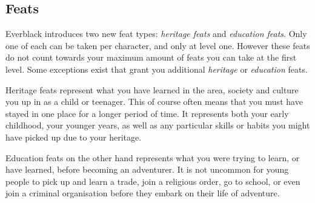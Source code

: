 \subsection{Feats}

Everblack introduces two new feat types: \emph{heritage feats} and
\emph{education feats}. Only one of each can be taken per character, and only
at level one. However these feats do not count towards your maximum amount of
feats you can take at the first level. Some exceptions exist that grant you
additional \emph{heritage} or \emph{education} feats.

Heritage feats represent what you have learned in the area, society and
culture you up in as a child or teenager. This of course often means that you
must have stayed in one place for a longer period of time. It represents both
your early childhood, your younger years, as well as any particular skills or
habits you might have picked up due to your heritage.

Education feats on the other hand represents what you were trying to learn,
or have learned, before becoming an adventurer. It is not uncommon for young
people to pick up and learn a trade, join a religious order, go to school,
or even join a criminal organisation before they embark on their life of
adventure.

